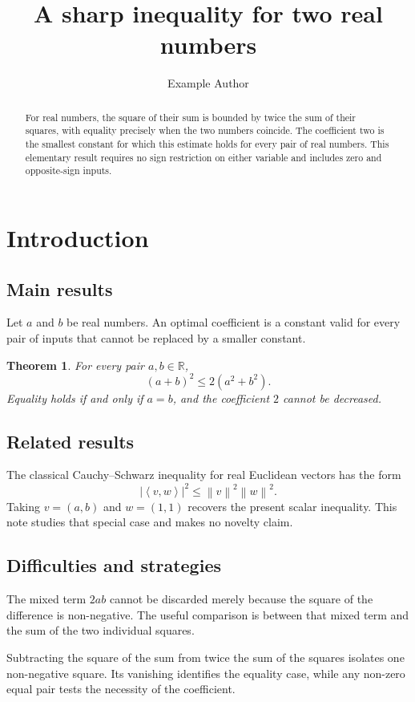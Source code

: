 \documentclass[a4paper,11pt,reqno]{amsart}
\title{A sharp inequality for two real numbers}
\author{Example Author}
\date{}
\newcommand{\R}{\mathbb{R}}
\newcommand{\abs}[1]{\left\lvert#1\right\rvert}
\newcommand{\norm}[1]{\left\lVert#1\right\rVert}
\newcommand{\inner}[2]{\left\langle#1,#2\right\rangle}
\numberwithin{equation}{section}
\theoremstyle{plain}
\newtheorem{thm}{Theorem}[section]
\theoremstyle{definition}
\theoremstyle{remark}
\begin{document}
\begin{abstract}
For real numbers, the square of their sum is bounded by twice the sum of their squares, with equality precisely when the two numbers coincide. The coefficient two is the smallest constant for which this estimate holds for every pair of real numbers. This elementary result requires no sign restriction on either variable and includes zero and opposite-sign inputs.
\end{abstract}
\maketitle

\section{Introduction}

\subsection{Main results}
Let $a$ and $b$ be real numbers. An optimal coefficient is a constant valid for every pair of inputs that cannot be replaced by a smaller constant.
\begin{thm}\label{thm:sum}
For every pair $a,b\in\R$,
\[
 (a+b)^2\leq 2(a^2+b^2).
\]
Equality holds if and only if $a=b$, and the coefficient $2$ cannot be decreased.
\end{thm}

\subsection{Related results}
The classical Cauchy--Schwarz inequality for real Euclidean vectors has the form
\[
 \abs{\inner{v}{w}}^2\leq\norm{v}^2\norm{w}^2.
\]
Taking $v=(a,b)$ and $w=(1,1)$ recovers the present scalar inequality. This note studies that special case and makes no novelty claim.

\subsection{Difficulties and strategies}
The mixed term $2ab$ cannot be discarded merely because the square of the difference is non-negative. The useful comparison is between that mixed term and the sum of the two individual squares.

Subtracting the square of the sum from twice the sum of the squares isolates one non-negative square. Its vanishing identifies the equality case, while any non-zero equal pair tests the necessity of the coefficient.
\end{document}
